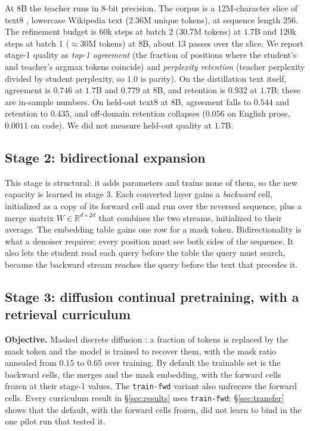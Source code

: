 \documentclass{article}
\newcommand{\trainfwd}{\texttt{train-fwd}}
\begin{document}
At $8$B the teacher runs in 8-bit precision. The corpus is a 12M-character slice of text8 \citep{mahoney2011text8}, lowercase Wikipedia text (2.36M unique tokens), at sequence length 256. The refinement budget is 60k steps at batch 2 (30.7M tokens) at $1.7$B and 120k steps at batch 1 (${\approx}30$M tokens) at $8$B, about 13 passes over the slice. We report stage-1 quality as \emph{top-1 agreement} (the fraction of positions where the student's and teacher's argmax tokens coincide) and \emph{perplexity retention} (teacher perplexity divided by student perplexity, so $1.0$ is parity). On the distillation text itself, agreement is $0.746$ at $1.7$B and $0.779$ at $8$B, and retention is $0.932$ at $1.7$B; these are in-sample numbers. On held-out text8 at $8$B, agreement falls to $0.544$ and retention to $0.435$, and off-domain retention collapses ($0.056$ on English prose, $0.0011$ on code). We did not measure held-out quality at $1.7$B.

\subsection{Stage 2: bidirectional expansion}\label{sec:stage2}

This stage is structural: it adds parameters and trains none of them, so the new capacity is learned in stage 3. Each converted layer gains a \emph{backward} cell, initialized as a copy of its forward cell and run over the reversed sequence, plus a merge matrix $W \in \mathbb{R}^{d \times 2d}$ that combines the two streams, initialized to their average. The embedding table gains one row for a mask token. Bidirectionality is what a denoiser requires: every position must see both sides of the sequence. It also lets the student read each query before the table the query must search, because the backward stream reaches the query before the text that precedes it.

\subsection{Stage 3: diffusion continual pretraining, with a retrieval curriculum}\label{sec:stage3}

\textbf{Objective.} Masked discrete diffusion \citep{austin2021d3pm,sahoo2024mdlm}: a fraction of tokens is replaced by the mask token and the model is trained to recover them, with the mask ratio annealed from $0.15$ to $0.65$ over training. By default the trainable set is the backward cells, the merges and the mask embedding, with the forward cells frozen at their stage-1 values. The \trainfwd{} variant also unfreezes the forward cells. Every curriculum result in \S\ref{sec:results} uses \trainfwd{}; \S\ref{sec:transfer} shows that the default, with the forward cells frozen, did not learn to bind in the one pilot run that tested it.
\end{document}
